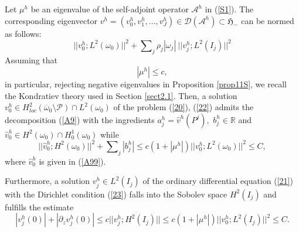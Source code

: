 \documentclass[11pt]{article}%
\numberwithin{equation}{section}
\begin{document}
Let $\mu^{h}$ be an eigenvalue of the self-adjoint operator $\mathcal{A}^{h}$
in (\ref{S1}). The corresponding eigenvector $v^{h}=(v_{0}^{h},v_{1}%
^{h},...,v_{J}^{h})\in\mathcal{D}(\mathcal{A}^{h})\subset\mathfrak{H}_{-}$ can
be normed as follows:%
\begin{equation}
||v_{0}^{h};L^{2}(\omega_{0})||^{2}+%
{\textstyle\sum\nolimits_{j}}
\rho_{j}|\omega_{j}|~||v_{j}^{h};L^{2}(I_{j})||^{2} \label{T1}%
\end{equation}
Assuming that%
\begin{equation}
|\mu^{h}|\leq c, \label{T2}%
\end{equation}
in particular, rejecting negative eigenvalues in Proposition \ref{prop11S}, we
recall the Kondratiev theory used in Section \ref{sect2.1}. Then, a solution
$v_{0}^{h}\in H_{loc}^{2}(\overline{\omega}_{0}\setminus\mathcal{P})\cap
L^{2}(\omega_{0})$ of the problem (\ref{20}), (\ref{22}) admits the
decomposition (\ref{A9}) with the ingredients $a_{j}^{h}=\widehat{v}^{h}%
(P^{j}),$ $b_{j}^{h}\in\mathbb{R}$ and $\widehat{v}_{0}^{h}\in H^{2}%
(\omega_{0})\cap H_{0}^{1}(\omega_{0})$ while%
\begin{equation}
||\widehat{v}_{0}^{h};H^{2}(\omega_{0})||^{2}+%
{\textstyle\sum\nolimits_{j}}
|b_{j}^{h}|\leq c(1+|\mu^{h}|)||v_{0}^{h};L^{2}(\omega_{0})||^{2}\leq C,
\label{T3}%
\end{equation}
where $\widehat{v}_{0}^{h}$ is given in (\ref{A99}).

Furthermore, a solution $v_{j}^{h}\in L^{2}(I_{j})$ of the ordinary
differential equation (\ref{21}) with the Dirichlet condition (\ref{23}) falls
into the Sobolev space $H^{2}(I_{j})$ and fulfills the estimate%
\begin{equation}
|v_{j}^{h}(0)|+|\partial_{z}v_{j}^{h}(0)|\leq c||v_{j}^{h};H^{2}(I_{j})||\leq
c(1+|\mu^{h}|)||v_{0}^{h};L^{2}(I_{j})||^{2}\leq C. \label{T4}%
\end{equation}
\end{document}
